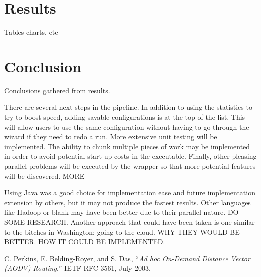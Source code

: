 \documentclass[12pt]{article}
\begin{document}
\section{Results}

Tables charts, etc

\section{Conclusion}

Conclusions gathered from results.

There are several next steps in the pipeline. In addition to using the
statistics to try to boost speed, adding savable configurations is at the top of
the list. This will allow users to use the same configuration without having to
go through the wizard if they need to redo a run. More extensive unit testing
will be implemented. The ability to chunk multiple pieces of work may be
implemented in order to avoid potential start up costs in the executable. 
Finally, other  pleasing parallel problems will be executed by the wrapper so 
that more potential features will be discovered. MORE

Using Java was a good choice for implementation ease and future implementation
extension by others, but it may not produce the fastest results. Other languages
like Hadoop or blank may have been better due to their parallel nature. DO SOME
RESEARCH. Another approach that could have been taken is one similar to the
bitches in Washington: going to the cloud. WHY THEY WOULD BE BETTER. HOW IT
COULD BE IMPLEMENTED.



\begin{thebibliography}{1}

C. Perkins,  E. Belding-Royer, and  S. Das, ``\emph{Ad hoc On-Demand
Distance Vector (AODV) Routing},'' IETF RFC 3561, July 2003.

\end{thebibliography}
\end{document}
